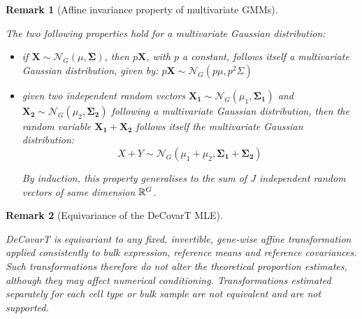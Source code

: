 \documentclass[pdflatex, sn-nature]{sn-jnl}
\theoremstyle{thmstyleone}%
\theoremstyle{thmstyletwo}%
\newtheorem{remark}{Remark}%
\theoremstyle{thmstylethree}%
\begin{document}
\begin{appendices}
        \begin{remark}[Affine invariance property of multivariate GMMs]
            \label{pr:multivariate-affine-transformation}

            The two following properties hold for a multivariate Gaussian
            distribution:
            \begin{itemize}
                \item if $\boldsymbol{X}\sim \mathcal{N}_{G}( \mu, \boldsymbol{\Sigma}
                    )$, then $p\boldsymbol{X}$, with $p$ a constant, follows
                    itself a multivariate Gaussian distribution, given by:
                    $p\boldsymbol{X}\sim \mathcal{N}_{G} (p \mu, p^{2} \Sigma)$

                \item given two independent random vectors $\boldsymbol{X_1}\sim
                    \mathcal{N}_{G}(\mu_{1}, \boldsymbol{\Sigma_1})$ and $\boldsymbol
                    {X_2}\sim \mathcal{N}_{G}(\mu_{2}, \boldsymbol{\Sigma_2})$ following
                    a multivariate Gaussian distribution, then the random
                    variable $\boldsymbol{X_1}+ \boldsymbol{X_2}$ follows itself
                    the multivariate Gaussian distribution:
                    \begin{equation*}
                        X + Y \sim \mathcal{N}_{G} (\mu_{1} + \mu_{2}, \boldsymbol
                        {\Sigma_1}+ \boldsymbol{\Sigma_2})
                    \end{equation*}

                    By induction, this property generalises to the sum of \(J\) independent
                    random vectors of same dimension \(\mathbb{R}^{G}\).
            \end{itemize}
        \end{remark}

        \begin{remark}[Equivariance of the DeCovarT MLE]
            \label{pr:decovart-affine-equivariance}

            DeCovarT is equivariant to any fixed, invertible, gene-wise affine
            transformation applied consistently to bulk expression, reference
            means and reference covariances. Such transformations therefore do
            not alter the theoretical proportion estimates, although they may
            affect numerical conditioning. Transformations estimated separately
            for each cell type or bulk sample are not equivalent and are not
            supported.


\end{remark}
\end{appendices}
\end{document}
